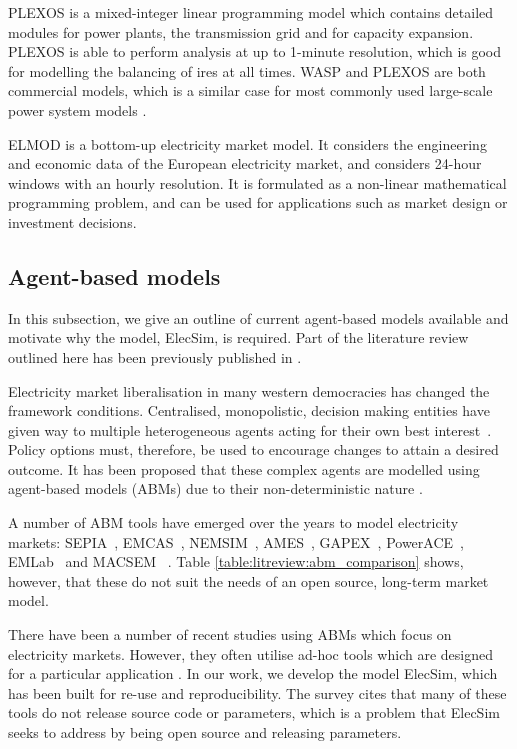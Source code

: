 PLEXOS is a mixed-integer linear programming model which contains detailed modules for power plants, the transmission grid and for capacity expansion. PLEXOS is able to perform analysis at up to 1-minute resolution, which is good for modelling the balancing of \acrshort{ires} at all times. WASP and PLEXOS are both commercial models, which is a similar case for most commonly used large-scale power system models \cite{Pfenninger2014}.

ELMOD is a bottom-up electricity market model. It considers the engineering and economic data of the European electricity market, and considers 24-hour windows with an hourly resolution. It is formulated as a non-linear mathematical programming problem, and can be used for applications such as market design or investment decisions.


\subsection*{Agent-based models}

In this subsection, we give an outline of current agent-based models available and motivate why the model, ElecSim, is required. Part of the literature review outlined here has been previously published in \cite{Kell}.

Electricity market liberalisation in many western democracies has changed the framework conditions. Centralised, monopolistic, decision making entities have given way to multiple heterogeneous agents acting for their own best interest~\cite{Most2010}. Policy options must, therefore, be used to encourage changes to attain a desired outcome. It has been proposed that these complex agents are modelled using agent-based models (ABMs) due to their non-deterministic nature \cite{Kell}. 

A number of ABM tools have emerged over the years to model electricity markets: SEPIA~\cite{Harp2000}, EMCAS~\cite{Conzelmann}, NEMSIM~\cite{Batten2006}, AMES~\cite{Sun2007}, GAPEX~\cite{Cincotti2013}, PowerACE~\cite{Rothengatter2007}, EMLab~\cite{Chappin2017} and MACSEM ~\cite{Praca2003}. Table \ref{table:litreview:abm_comparison} shows, however, that these do not suit the needs of an open source, long-term market model. 

There have been a number of recent studies using ABMs which focus on electricity markets. However, they often utilise ad-hoc tools which are designed for a particular application \cite{hadar2019, Kunzel2018, Saxena2019}. In our work, we develop the model ElecSim, which has been built for re-use and reproducibility. The survey \cite{Weidlich2008} cites that many of these tools do not release source code or parameters, which is a problem that ElecSim seeks to address by being open source and releasing parameters.


